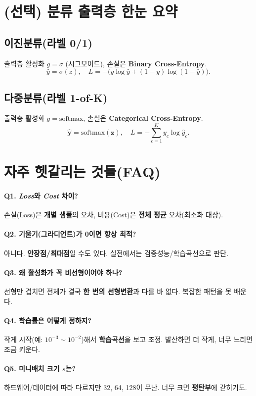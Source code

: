 \documentclass[12pt]{article}
\begin{document}
\section{(선택) 분류 출력층 한눈 요약}
\subsection*{이진분류(라벨 0/1)}
출력층 활성화 \(g=\sigma\) (시그모이드), 손실은 \textbf{Binary Cross-Entropy}.
\[
\hat{y}=\sigma(z),\quad
L=-\big(y\log \hat{y} + (1-y)\log(1-\hat{y})\big).
\]
\subsection*{다중분류(라벨 1-of-K)}
출력층 활성화 \(g=\text{softmax}\), 손실은 \textbf{Categorical Cross-Entropy}.
\[
\hat{\bm y}=\text{softmax}(\bm z),\quad
L=-\sum_{c=1}^{K} y_c\log \hat{y}_c.
\]

\section{자주 헷갈리는 것들(FAQ)}
\paragraph{Q1. \textit{Loss}와 \textit{Cost} 차이?}
손실(Loss)은 \textbf{개별 샘플}의 오차, 비용(Cost)은 \textbf{전체 평균} 오차(최소화 대상).

\paragraph{Q2. 기울기(그라디언트)가 0이면 항상 최적?}
아니다. \textbf{안장점/최대점}일 수도 있다. 실전에서는 검증성능/학습곡선으로 판단.

\paragraph{Q3. 왜 활성화가 꼭 비선형이어야 하나?}
선형만 겹치면 전체가 결국 \textbf{한 번의 선형변환}과 다를 바 없다. 복잡한 패턴을 못 배운다.

\paragraph{Q4. 학습률은 어떻게 정하지?}
작게 시작(예: $10^{-3}\sim 10^{-2}$)해서 \textbf{학습곡선}을 보고 조정. 발산하면 더 작게, 너무 느리면 조금 키운다.

\paragraph{Q5. 미니배치 크기 $s$는?}
하드웨어/데이터에 따라 다르지만 32, 64, 128이 무난. 너무 크면 \textbf{평탄부}에 갇히기도.
\end{document}
